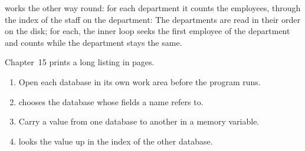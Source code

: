  works the other way round: for each department it counts the
employees, through the index of the staff on the department:
The departments are read in their order on the disk; for each, the inner loop
seeks the first employee of the department and counts while the department
stays the same.

Chapter~15 prints a long listing in pages.

\begin{enumerate}
\item Open each database in its own work area before the program runs.
\item {} chooses the database whose fields a name refers to.
\item Carry a value from one database to another in a memory variable.
\item {} looks the value up in the index of the other database.
\end{enumerate}
